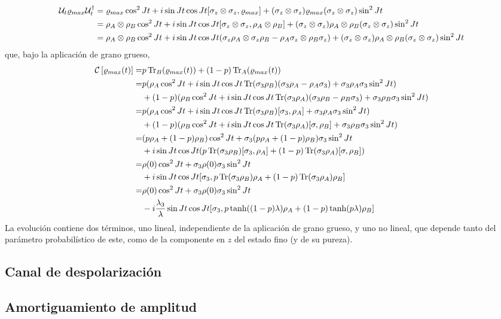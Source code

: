 \begin{align*}
    \mathcal{U}_{t}\varrho_{max}\mathcal{U}_{t}^{\dag}&=\varrho_{max}\cos^{2}{Jt}+i\sin{Jt}\cos{Jt}[\sigma_{z}\otimes\sigma_{z},\varrho_{max}]+(\sigma_{z}\otimes\sigma_{z}) \varrho_{max} (\sigma_{z}\otimes\sigma_{z}) \sin^{2}{Jt}\\
    &=\rho_{A}\otimes\rho_{B}\cos^{2}{Jt}+i\sin{Jt}\cos{Jt}[\sigma_{z}\otimes\sigma_{z},\rho_{A}\otimes\rho_{B}]+(\sigma_{z}\otimes\sigma_{z}) \rho_{A}\otimes\rho_{B} (\sigma_{z}\otimes\sigma_{z}) \sin^{2}{Jt}\\
    &=\rho_{A}\otimes\rho_{B}\cos^{2}{Jt}+i\sin{Jt}\cos{Jt}(\sigma_{z}\rho_{A}\otimes\sigma_{z}\rho_{B} - \rho_{A}\sigma_{z}\otimes\rho_{B}\sigma_{z})+(\sigma_{z}\otimes\sigma_{z}) \rho_{A}\otimes\rho_{B} (\sigma_{z}\otimes\sigma_{z}) \sin^{2}{Jt}
\end{align*}
que, bajo la aplicación de grano grueso,
\begin{align*}
    \mathcal{C}\left[\varrho_{max}(t)\right]=&p\Tr_{B}(\varrho_{max}(t))+(1-p)\Tr_{A}(\varrho_{max}(t))\\
    =&p(\rho_{A}\cos^{2}{Jt}+i\sin{Jt}\cos{Jt}\Tr(\sigma_{3} \rho_{B})(\sigma_{3}\rho_{A}- \rho_{A}\sigma_{3})+\sigma_{3}\rho_{A}\sigma_{3}\sin^{2}{Jt})\\
    &+(1-p)(\rho_{B}\cos^{2}{Jt}+i\sin{Jt}\cos{Jt}\Tr(\sigma_{3} \rho_{A})(\sigma_{3}\rho_{B}- \rho_{B}\sigma_{3})+\sigma_{3}\rho_{B}\sigma_{3}\sin^{2}{Jt})\\
    =&p(\rho_{A}\cos^{2}{Jt}+i\sin{Jt}\cos{Jt}\Tr(\sigma_{3} \rho_{B})[\sigma_{3},\rho_{A}]+\sigma_{3}\rho_{A}\sigma_{3}\sin^{2}{Jt})\\
    &+(1-p)(\rho_{B}\cos^{2}{Jt}+i\sin{Jt}\cos{Jt}\Tr(\sigma_{3} \rho_{A})[\sigma,\rho_{B}]+\sigma_{3}\rho_{B}\sigma_{3}\sin^{2}{Jt})\\
    =&(p\rho_{A}+(1-p)\rho_{B})\cos^{2}{Jt}+\sigma_{3}(p\rho_{A}+(1-p)\rho_{B})\sigma_{3}\sin^{2}{Jt}\\
    &+i\sin{Jt}\cos{Jt}(p\Tr(\sigma_{3} \rho_{B})[\sigma_{3},\rho_{A}]+(1-p)\Tr(\sigma_{3} \rho_{A})[\sigma,\rho_{B}])\\
    =&\rho(0)\cos^{2}{Jt}+\sigma_{3}\rho(0)\sigma_{3}\sin^{2}{Jt}\\
    &+i\sin{Jt}\cos{Jt}[\sigma_{3},p\Tr(\sigma_{3} \rho_{B})\rho_{A}+(1-p)\Tr(\sigma_{3} \rho_{A})\rho_{B}]\\
    =&\rho(0)\cos^{2}{Jt}+\sigma_{3}\rho(0)\sigma_{3}\sin^{2}{Jt}\\
    &-i\frac{\lambda_{3}}{\lambda}\sin{Jt}\cos{Jt}[\sigma_{3},p\tanh((1-p)\lambda)\rho_{A}+(1-p)\tanh(p\lambda)\rho_{B}]
\end{align*}	
La evolución contiene dos términos, uno lineal, independiente de la aplicación de grano grueso, y uno no lineal, que depende tanto del parámetro probabilístico de este, como de la componente en $z$ del estado fino (y de su pureza).  

\subsection{Canal de despolarización}

\subsection{Amortiguamiento de amplitud}